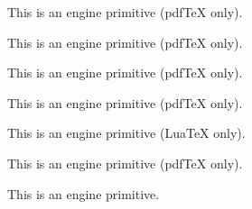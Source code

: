 \begin{function}[]
  {
    \pdfglyphtounicode
  }
  \begin{syntax}
  \end{syntax}
  This is an engine primitive (pdf\TeX{} only).
\end{function}



\begin{function}[]
  {
    \pdfhorigin
  }
  \begin{syntax}
  \end{syntax}
  This is an engine primitive (pdf\TeX{} only).
\end{function}



\begin{function}[]
  {
    \pdftexrevision
  }
  \begin{syntax}
  \end{syntax}
  This is an engine primitive (pdf\TeX{} only).
\end{function}



\begin{function}[]
  {
    \pdftexversion
  }
  \begin{syntax}
  \end{syntax}
  This is an engine primitive (pdf\TeX{} only).
\end{function}



\begin{function}[]
  {
    \pdfvariable
  }
  \begin{syntax}
  \end{syntax}
  This is an engine primitive (Lua\TeX{} only).
\end{function}



\begin{function}[]
  {
    \pdfvorigin
  }
  \begin{syntax}
  \end{syntax}
  This is an engine primitive (pdf\TeX{} only).
\end{function}



\begin{function}[]
  {
    \penalty
  }
  \begin{syntax}
  \end{syntax}
  This is an engine primitive.
\end{function}



